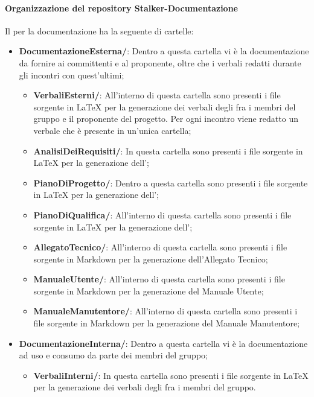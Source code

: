 \paragraph{Organizzazione del repository Stalker-Documentazione}
Il  per la documentazione ha la seguente  di cartelle:
\begin{itemize}
	\item \textbf{DocumentazioneEsterna/}: Dentro a questa cartella vi è la documentazione da fornire ai committenti e al proponente, oltre che i verbali redatti durante gli incontri con quest'ultimi;
	\begin{itemize}
		\item \textbf{VerbaliEsterni/}: All'interno di questa cartella sono presenti i file sorgente in \LaTeX{} per la generazione dei verbali degli  fra i membri del gruppo e il proponente del progetto.
		Per ogni incontro viene redatto un verbale che è presente in un'unica cartella;
		\item \textbf{AnalisiDeiRequisiti/}: In questa cartella sono presenti i file sorgente in \LaTeX{} per la generazione dell'\AdR{};
		\item \textbf{PianoDiProgetto/}: Dentro a questa cartella sono presenti i file sorgente in \LaTeX{} per la generazione dell'\PdP{};
		\item \textbf{PianoDiQualifica/}: All'interno di questa cartella sono presenti i file sorgente in \LaTeX{} per la generazione dell'\PdQ{};
		\item \textbf{AllegatoTecnico/}: All'interno di questa cartella sono presenti i file sorgente in Markdown per la generazione dell'Allegato Tecnico;
		\item \textbf{ManualeUtente/}: All'interno di questa cartella sono presenti i file sorgente in Markdown per la generazione del Manuale Utente;
		\item \textbf{ManualeManutentore/}: All'interno di questa cartella sono presenti i file sorgente in Markdown per la generazione del Manuale Manutentore;
	\end{itemize}
	\item \textbf{DocumentazioneInterna/}: Dentro a questa cartella vi è la documentazione ad uso e consumo da parte dei membri del gruppo;
	\begin{itemize}
		\item \textbf{VerbaliInterni/}: In questa cartella sono presenti i file sorgente in \LaTeX{} per la generazione dei verbali degli  fra i membri del gruppo.

\end{itemize}
\end{itemize}
